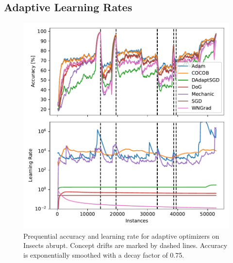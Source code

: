 \documentclass[letterpaper]{article} %
\begin{document}
\subsection{Adaptive Learning Rates}

\begin{figure}[hb]
	\centering
	\includegraphics[width=.47\textwidth]{figures/lr_norms_optims_insects_abrupt.pdf}
	\caption{Prequential accuracy and learning rate for adaptive optimizers on Insects abrupt. Concept drifts are marked by dashed lines. Accuracy is exponentially smoothed with a decay factor of 0.75.}
	\label{fig:prequential_optims_insects}
\end{figure}
\end{document}
